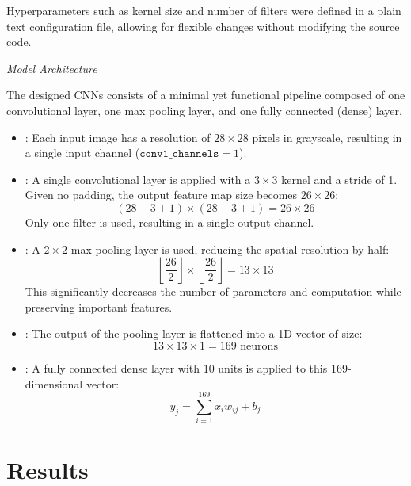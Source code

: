 \documentclass[conference]{IEEEtran}
\begin{document}
Hyperparameters such as kernel size and number of filters were defined in a plain text configuration file, allowing for flexible changes without modifying the source code.

\textit{Model Architecture}

The designed CNNs consists of a minimal yet functional pipeline composed of one convolutional layer, one max pooling layer, and one fully connected (dense) layer.

\begin{itemize}
\item {}: Each input image has a resolution of $28 \times 28$ pixels in grayscale, resulting in a single input channel ($\texttt{conv1\_channels} = 1$).

\item {}: A single convolutional layer is applied with a $3 \times 3$ kernel and a stride of 1. Given no padding, the output feature map size becomes $26 \times 26$:
\begin{equation}
(28 - 3 + 1) \times (28 - 3 + 1) = 26 \times 26
\end{equation}
Only one filter is used, resulting in a single output channel.

\item {}: A $2 \times 2$ max pooling layer is used, reducing the spatial resolution by half:
\begin{equation}
\left\lfloor \frac{26}{2} \right\rfloor \times \left\lfloor \frac{26}{2} \right\rfloor = 13 \times 13
\end{equation}
This significantly decreases the number of parameters and computation while preserving important features.

\item {}: The output of the pooling layer is flattened into a 1D vector of size:
\begin{equation}
13 \times 13 \times 1 = 169 \text{ neurons}
\end{equation}

\item {}: A fully connected dense layer with 10 units is applied to this 169-dimensional vector:
\begin{equation}
    y_j = \sum_{i=1}^{169} x_i w_{ij} + b_j
\end{equation}
\end{itemize}


\section{Results}
\end{document}

